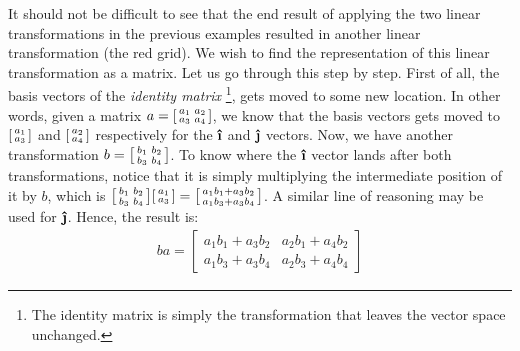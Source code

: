 It should not be difficult to see that the end result of applying the two linear transformations in the previous examples resulted in another linear transformation (the red grid). We wish to find the representation of this linear transformation as a matrix. Let us go through this step by step. First of all, the basis vectors of the \emph{identity matrix} \footnote{The identity matrix is simply the transformation that leaves the vector space unchanged.}, gets moved to some new location. In other words, given a matrix \(a=\begin{bsmallmatrix}
  a_1 & a_2 \\
  a_3 & a_4
\end{bsmallmatrix} \), we know that the basis vectors gets moved to \(\begin{bsmallmatrix}
  a_1 \\
  a_3
\end{bsmallmatrix} \) and \(\begin{bsmallmatrix}
  a_2 \\
  a_4
\end{bsmallmatrix} \) respectively for the \(\ihat\) and \(\jhat\) vectors. Now, we have another transformation \(b=\begin{bsmallmatrix}
  b_1 & b_2 \\
  b_3 & b_4
\end{bsmallmatrix} \). To know where the \(\ihat\) vector lands after both transformations, notice that it is simply multiplying the intermediate position of it by \(b\), which is \(\begin{bsmallmatrix}
  b_1 & b_2 \\
  b_3 & b_4
\end{bsmallmatrix} \begin{bsmallmatrix}
  a_1 \\
  a_3
\end{bsmallmatrix} = \begin{bsmallmatrix}
  a_1 b_1 + a_3 b_2 \\
  a_1 b_3 + a_3 b_4
\end{bsmallmatrix} \). A similar line of reasoning may be used for \(\jhat\). Hence, the result is:
\begin{align*}
  ba = \begin{bmatrix}
    a_1 b_1 + a_3 b_2 &  a_2 b_1 + a_4 b_2 \\
    a_1 b_3 + a_3 b_4 &  a_2 b_3 + a_4 b_4
  \end{bmatrix} 
\end{align*}


